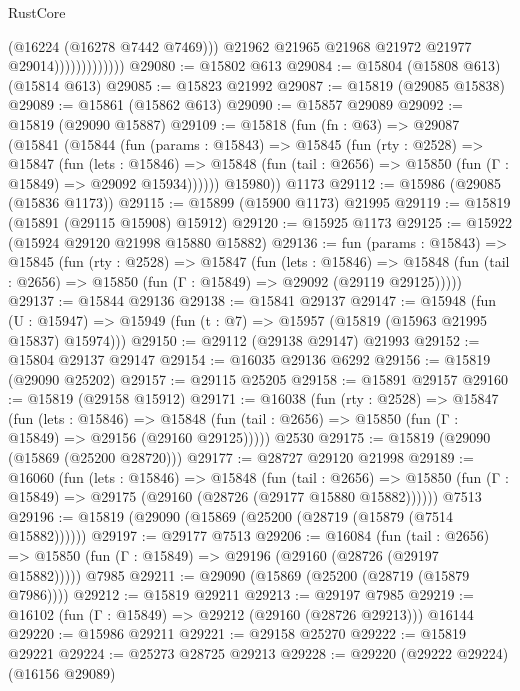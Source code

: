 \begin{lexlean}{RustCore}
\begin{coremodule}
                                (@16224 (@16278 @7442 @7469)))
                              @21962
                              @21965
                              @21968
                              @21972
                              @21977
                              @29014)))))))))))))
@29080 := @15802 @613
@29084 := @15804 (@15808 @613) (@15814 @613)
@29085 := @15823 @21992
@29087 := @15819 (@29085 @15838)
@29089 := @15861 (@15862 @613)
@29090 := @15857 @29089
@29092 := @15819 (@29090 @15887)
@29109 := @15818
    (fun (fn : @63) =>
    @29087
      (@15841
        (@15844
          (fun (params : @15843) =>
          @15845
            (fun (rty : @2528) =>
            @15847
              (fun (lets : @15846) =>
              @15848 (fun (tail : @2656) => @15850 (fun (Γ : @15849) => @29092 @15934))))))
        @15980))
    @1173
@29112 := @15986 (@29085 (@15836 @1173))
@29115 := @15899 (@15900 @1173) @21995
@29119 := @15819 (@15891 (@29115 @15908) @15912)
@29120 := @15925 @1173
@29125 := @15922 (@15924 @29120 @21998 @15880 @15882)
@29136 := fun (params : @15843) =>
  @15845
    (fun (rty : @2528) =>
    @15847
      (fun (lets : @15846) =>
      @15848 (fun (tail : @2656) => @15850 (fun (Γ : @15849) => @29092 (@29119 @29125)))))
@29137 := @15844 @29136
@29138 := @15841 @29137
@29147 := @15948
    (fun (U : @15947) => @15949 (fun (t : @7) => @15957 (@15819 (@15963 @21995 @15837) @15974)))
@29150 := @29112 (@29138 @29147) @21993
@29152 := @15804 @29137 @29147
@29154 := @16035 @29136 @6292
@29156 := @15819 (@29090 @25202)
@29157 := @29115 @25205
@29158 := @15891 @29157
@29160 := @15819 (@29158 @15912)
@29171 := @16038
    (fun (rty : @2528) =>
    @15847
      (fun (lets : @15846) =>
      @15848 (fun (tail : @2656) => @15850 (fun (Γ : @15849) => @29156 (@29160 @29125)))))
    @2530
@29175 := @15819 (@29090 (@15869 (@25200 @28720)))
@29177 := @28727 @29120 @21998
@29189 := @16060
    (fun (lets : @15846) =>
    @15848
      (fun (tail : @2656) =>
      @15850 (fun (Γ : @15849) => @29175 (@29160 (@28726 (@29177 @15880 @15882))))))
    @7513
@29196 := @15819 (@29090 (@15869 (@25200 (@28719 (@15879 (@7514 @15882))))))
@29197 := @29177 @7513
@29206 := @16084
    (fun (tail : @2656) => @15850 (fun (Γ : @15849) => @29196 (@29160 (@28726 (@29197 @15882)))))
    @7985
@29211 := @29090 (@15869 (@25200 (@28719 (@15879 @7986))))
@29212 := @15819 @29211
@29213 := @29197 @7985
@29219 := @16102 (fun (Γ : @15849) => @29212 (@29160 (@28726 @29213))) @16144
@29220 := @15986 @29211
@29221 := @29158 @25270
@29222 := @15819 @29221
@29224 := @25273 @28725 @29213
@29228 := @29220 (@29222 @29224) (@16156 @29089)

\end{coremodule}
\end{lexlean}
